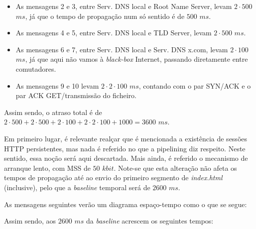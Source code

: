 \begin{enumerate}[leftmargin=\labelsep]
        \begin{itemize}
          \item As mensagens 2 e 3, entre Serv. DNS local e Root Name Server,
                levam $2 \cdot 500$ $ms$, já que o tempo de propagação num só sentido
                é de $500$ $ms$.
          \item As mensagens 4 e 5, entre Serv. DNS local e TLD Server,
                levam $2 \cdot 500$ $ms$.
          \item As mensagens 6 e 7, entre Serv. DNS local e Serv. DNS x.com,
                levam $2 \cdot 100$ $ms$, já que aqui não vamos à \textit{black-box} Internet,
                passando diretamente entre comutadores.
          \item As mensagens 9 e 10 levam $2 \cdot 2 \cdot 100$ $ms$, contando com o par
                SYN/ACK e o par ACK GET/transmissão do ficheiro.
        \end{itemize}

        Assim sendo, o atraso total é de $2 \cdot 500 + 2 \cdot 500 + 2 \cdot 100 + 2 \cdot 2 \cdot 100 + 1000 = 3600$ $ms$.


        Em primeiro lugar, é relevante realçar que é mencionada a existência de sessões
        HTTP persistentes, mas nada é referido no que a pipelining diz respeito. Neste sentido,
        essa noção será aqui descartada. Mais ainda, é referido o mecanismo de arranque lento,
        com MSS de $50$ $kbit$. Note-se que esta alteração não afeta os tempos de propagação até
        ao envio do primeiro segmento de \textit{index.html} (inclusive), pelo que a \textit{baseline}
        temporal será de $2600$ $ms$.

        As mensagens seguintes verão um diagrama espaço-tempo como o que se segue:

        \begin{figure}[H]
          \centering
          
        \end{figure}

        Assim sendo, aos $2600$ $ms$ da \textit{baseline} acrescem os seguintes tempos:


\end{enumerate}
